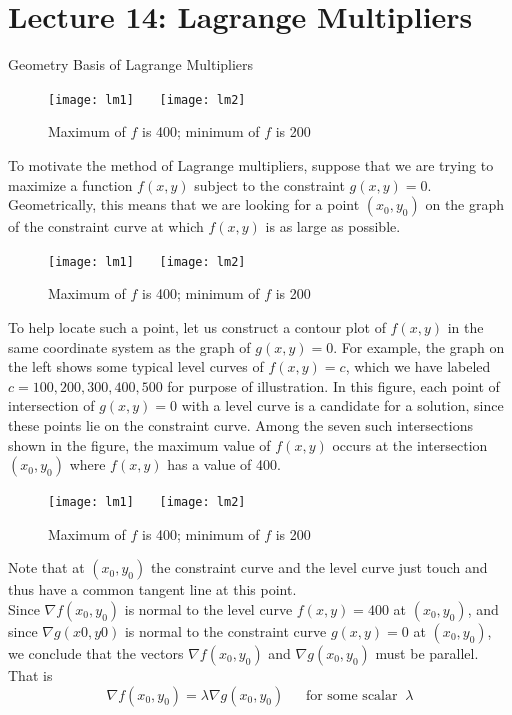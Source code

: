 \documentclass[10pt]{beamer}
\begin{document}
\section{Lecture 14: Lagrange Multipliers}

\begin{frame}[allowframebreaks]{Geometry Basis of Lagrange Multipliers}~\\
\begin{figure}[H]
	\centering
	\texttt{[image: lm1]}~~~
	\texttt{[image: lm2]}
	\caption{Maximum of $f$ is 400; minimum of $f$ is 200}
\end{figure}
To motivate the method of Lagrange multipliers, suppose that we are trying to maximize
a function $f(x,y)$ subject to the constraint $g(x, y) = 0$. Geometrically, this means that we
are looking for a point $(x_0, y_0)$ on the graph of the constraint curve at which $f(x, y)$ is as
large as possible.\newpage
\begin{figure}[H]
	\centering
	\texttt{[image: lm1]}~~~
	\texttt{[image: lm2]}
	\caption{Maximum of $f$ is 400; minimum of $f$ is 200}
\end{figure}
To help locate such a point, let us construct a contour plot of $f(x, y)$ in the same coordinate system as the graph of $g(x, y) = 0$. For example, the graph on the left shows some typical level curves  of $f(x,y) = c$, which we have labeled $c = 100,200,300,400,500$ for purpose of illustration. In this figure, each point of intersection of $g(x, y) = 0$
with a level curve is a candidate for a solution, since these points lie on the constraint curve. Among the seven such intersections shown in the figure, the maximum value of $f(x, y)$
occurs at the intersection $(x_0, y_0)$ where $f(x, y)$ has a value of 400.\newpage
\begin{figure}[H]
	\centering
	\texttt{[image: lm1]}~~~
	\texttt{[image: lm2]}
	\caption{Maximum of $f$ is 400; minimum of $f$ is 200}
\end{figure}
 Note that at $(x_0, y_0)$
the constraint curve and the level curve just {\color{red}touch} and thus have a {\color{red}common tangent line} at this point.
\\Since $\nabla f(x_0, y_0)$ is {\color{red} normal} to the level curve $f(x, y) = 400$ at $(x_0, y_0)$, and
since $\nabla g(x0, y0)$ is {\color{red} normal} to the constraint curve $g(x, y) = 0$ at $(x_0, y_0)$, we conclude that
the vectors $\nabla f(x_0, y_0)$ and $\nabla g(x_0, y_0)$ must be {\color{red} parallel}. That is 
$$\nabla f(x_0, y_0) = \lambda \nabla g(x_0, y_0)~~~~~~~\text{for some scalar } ~ \lambda$$
\end{frame}
\end{document}
